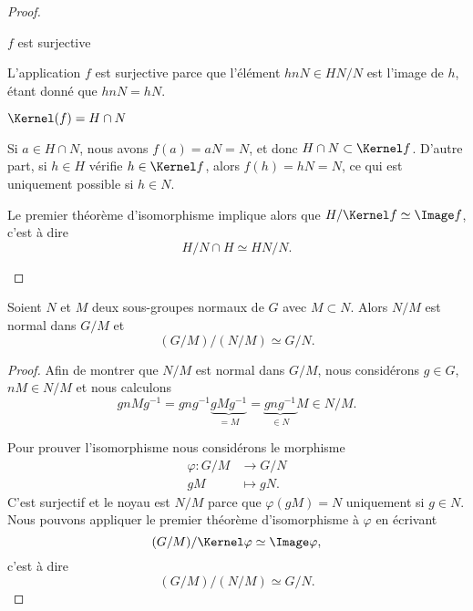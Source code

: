 \begin{proof}
\begin{enumerate}
            \begin{subproof}
                \item[\( f\) est surjective]

                    L'application \( f\) est surjective parce que l'élément \( hnN\in HN/N\) est l'image de \( h\), étant donné que \( hnN=hN\).

                \item[\( \Kernel(f)=H\cap N\)]

            Si \( a\in H\cap N\), nous avons \( f(a) =aN = N\), et donc \( H\cap N\subset \Kernel f\). D'autre part, si \( h\in H\) vérifie \( h\in\Kernel f\), alors \( f(h)=hN=N\), ce qui est uniquement possible si \( h\in N\).

            \end{subproof}
            Le premier théorème d'isomorphisme implique alors que \( H/\Kernel f\simeq \Image f\), c'est à dire
            \begin{equation}
                H/N\cap H\simeq HN/N.
            \end{equation}
    \end{enumerate}
\end{proof}

\begin{theorem}  \label{ThoezgBep}
    Soient \( N\) et \( M\) deux sous-groupes normaux de \( G\) avec \( M\subset N\). Alors \( N/M\) est normal dans \( G/M\) et
    \begin{equation}
        (G/M)/(N/M)\simeq G/N.
    \end{equation}
\end{theorem}

\begin{proof}
    Afin de montrer que \( N/M\) est normal dans \( G/M\), nous considérons \( g\in G\), \( nM\in N/M\) et nous calculons
    \begin{equation}
        gnMg^{-1}=gng^{-1}\underbrace{gMg^{-1}}_{=M}=\underbrace{gng^{-1}}_{\in N}M\in N/M.
    \end{equation}

    Pour prouver l'isomorphisme nous considérons le morphisme
    \begin{equation}
        \begin{aligned}
            \varphi\colon G/M&\to G/N \\
            gM&\mapsto gN.
        \end{aligned}
    \end{equation}
    C'est surjectif et le noyau est \( N/M\) parce que \( \varphi(gM)=N\) uniquement si \( g\in N\). Nous pouvons appliquer le premier théorème d'isomorphisme à \( \varphi\) en écrivant
    \begin{equation}
        (G/M)/\Kernel \varphi\simeq\Image \varphi,
    \end{equation}
    c'est à dire
    \begin{equation}
        (G/M)/(N/M)\simeq G/N.
    \end{equation}
\end{proof}

